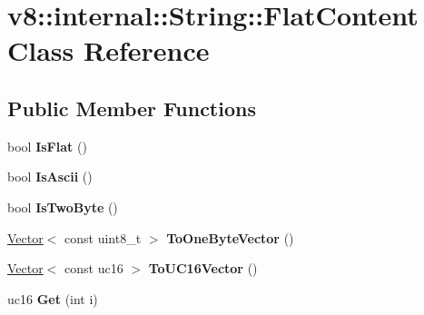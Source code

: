 \hypertarget{classv8_1_1internal_1_1_string_1_1_flat_content}{}\section{v8\+:\+:internal\+:\+:String\+:\+:Flat\+Content Class Reference}
\label{classv8_1_1internal_1_1_string_1_1_flat_content}
\subsection*{Public Member Functions}
\begin{DoxyCompactItemize}
\item 
\hypertarget{classv8_1_1internal_1_1_string_1_1_flat_content_a75210c93d9fcaeaa1a8862d34feef81d}{}bool {\bfseries Is\+Flat} ()\label{classv8_1_1internal_1_1_string_1_1_flat_content_a75210c93d9fcaeaa1a8862d34feef81d}

\item 
\hypertarget{classv8_1_1internal_1_1_string_1_1_flat_content_aa353bf17c30bfdb658d6b2dc0ec8682f}{}bool {\bfseries Is\+Ascii} ()\label{classv8_1_1internal_1_1_string_1_1_flat_content_aa353bf17c30bfdb658d6b2dc0ec8682f}

\item 
\hypertarget{classv8_1_1internal_1_1_string_1_1_flat_content_aca97c9ba0b87f12920bce7d70dc533a3}{}bool {\bfseries Is\+Two\+Byte} ()\label{classv8_1_1internal_1_1_string_1_1_flat_content_aca97c9ba0b87f12920bce7d70dc533a3}

\item 
\hypertarget{classv8_1_1internal_1_1_string_1_1_flat_content_a8d691831fa6f981faf9d370cc127ebd9}{}\hyperlink{classv8_1_1internal_1_1_vector}{Vector}$<$ const uint8\+\_\+t $>$ {\bfseries To\+One\+Byte\+Vector} ()\label{classv8_1_1internal_1_1_string_1_1_flat_content_a8d691831fa6f981faf9d370cc127ebd9}

\item 
\hypertarget{classv8_1_1internal_1_1_string_1_1_flat_content_ab3025edb4da7c559232dc5541fc209c5}{}\hyperlink{classv8_1_1internal_1_1_vector}{Vector}$<$ const uc16 $>$ {\bfseries To\+U\+C16\+Vector} ()\label{classv8_1_1internal_1_1_string_1_1_flat_content_ab3025edb4da7c559232dc5541fc209c5}

\item 
\hypertarget{classv8_1_1internal_1_1_string_1_1_flat_content_aa97ac376bf03bb3e0ceac041bf29ef61}{}uc16 {\bfseries Get} (int i)\label{classv8_1_1internal_1_1_string_1_1_flat_content_aa97ac376bf03bb3e0ceac041bf29ef61}

\end{DoxyCompactItemize}
